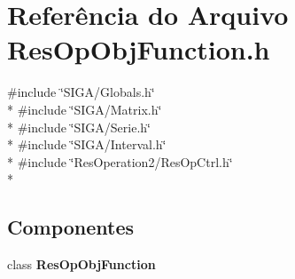 \section{Referência do Arquivo Res\+Op\+Obj\+Function.\+h}
\label{_2_obj_function_2_res_op_obj_function_8h}
{\ttfamily \#include \char`\"{}S\+I\+G\+A/\+Globals.\+h\char`\"{}}\\*
{\ttfamily \#include \char`\"{}S\+I\+G\+A/\+Matrix.\+h\char`\"{}}\\*
{\ttfamily \#include \char`\"{}S\+I\+G\+A/\+Serie.\+h\char`\"{}}\\*
{\ttfamily \#include \char`\"{}S\+I\+G\+A/\+Interval.\+h\char`\"{}}\\*
{\ttfamily \#include \char`\"{}Res\+Operation2/\+Res\+Op\+Ctrl.\+h\char`\"{}}\\*
\subsection*{Componentes}
\begin{DoxyCompactItemize}
\item 
class {\bf Res\+Op\+Obj\+Function}
\end{DoxyCompactItemize}
